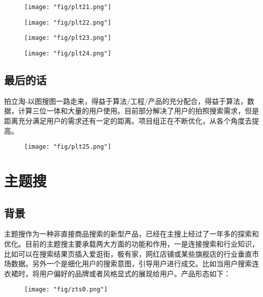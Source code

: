 \begin{figure}[!h]
	\centering
	\texttt{[image: "fig/plt21.png"]}
	\caption{}
	\label{fig:plt21}
\end{figure}

\begin{figure}[!h]
\begin{minipage}[t]{0.5\linewidth}
\centering
\texttt{[image: "fig/plt22.png"]}
\caption{}
\label{fig:plt22}
\end{minipage}%
\begin{minipage}[t]{0.5\linewidth}
\centering
\texttt{[image: "fig/plt23.png"]}
\caption{}
\label{fig:plt23}
\end{minipage}
\begin{minipage}[t]{0.5\linewidth}
\centering
\texttt{[image: "fig/plt24.png"]}
\caption{}
\label{fig:plt24}
\end{minipage}
\end{figure}

\subsection{最后的话}
拍立淘-以图搜图一路走来，得益于算法/工程/产品的充分配合，得益于算法，数据，计算三位一体和大量的用户使用。目前部分解决了用户的拍照搜索需求，但是距离充分满足用户的需求还有一定的距离。项目组正在不断优化，从各个角度去提高。
\begin{figure}[!h]
	\centering
	\texttt{[image: "fig/plt25.png"]}
	\caption{}
	\label{fig:plt25}
\end{figure}


\section{主题搜}

\subsection{背景}
主题搜作为一种非直接商品搜索的新型产品，已经在主搜上经过了一年多的探索和优化。目前的主题搜主要承载两大方面的功能和作用，一是连接搜索和行业知识，比如可以在搜索结果页插入爱逛街，极有家，网红店铺或某些旗舰店的行业垂直市场数据。另外一个是细化用户的搜索意图，引导用户进行成交。比如当用户搜索连衣裙时，将用户偏好的品牌或者风格显式的展现给用户。产品形态如下：
\begin{figure}[!h]
	\centering
	\texttt{[image: "fig/zts0.png"]}
	\caption{}
	\label{fig:zts0}
\end{figure}

